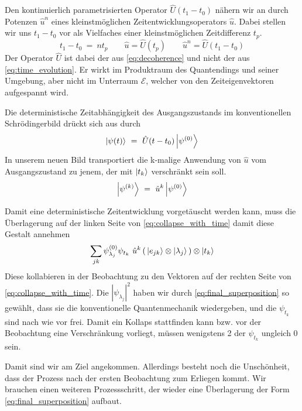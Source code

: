 \documentclass[12pt]{article}
\begin{document}
Den kontinuierlich parametrisierten Operator $\hat{U}(t_1-t_0)$ nähern wir an durch Potenzen $\hat{u}^n$ eines kleinstmöglichen Zeitentwicklungsoperators $\hat{u}$. Dabei stellen wir uns $t_1-t_0$ vor als Vielfaches einer kleinstmöglichen Zeitdifferenz $t_p$.
\begin{equation*}
t_1-t_0\ =\ n t_p \quad\quad 
\hat{u} = \hat{U}(t_p) \quad\quad 
\hat{u}^n = \hat{U}(t_1-t_0)
\end{equation*}
Der Operator $\hat{U}$ ist dabei der aus \eqref{eq:decoherence} und nicht der aus \eqref{eq:time_evolution}. Er wirkt im Produktraum des Quantendings und seiner Umgebung, aber nicht im Unterraum $\mathscr{E}$, welcher von den Zeiteigenvektoren aufgespannt wird.

Die deterministische Zeitabhängigkeit des Ausgangszustands im konventionellen Schrödingerbild drückt sich aus durch
\begin{equation*}
\ket{\psi(t)}\ =\ \hat{U}(t-t_0)\ket{\psi^{(0)}}
\end{equation*} 
In unserem neuen Bild transportiert die k-malige Anwendung von $\hat{u}$ vom Ausgangszustand zu jenem, der mit $\ket{t_k}$ verschränkt sein soll.
\begin{equation*}
\ket{\psi^{(k)}}\ =\ \hat{u}^k \ket{\psi^{(0)}}
\end{equation*} 

Damit eine deterministische Zeitentwicklung vorgetäuscht werden kann, muss die Überlagerung auf der linken Seite von \eqref{eq:collapse_with_time} damit diese Gestalt annehmen
\begin{equation}
\label{eq:final_superposition}
\sum_{jk} \psi_{\lambda_j}^{(0)}\psi_{t_k}\ \hat{u}^{k} \left(\,\ket{e_{jk}} \otimes \ket{\lambda_j} \,\right) \otimes \ket{t_k}
\end{equation}
Diese kollabieren in der Beobachtung zu den Vektoren auf der rechten Seite von  \eqref{eq:collapse_with_time}. Die $|\psi_{\lambda_j}|^2$ haben wir durch \eqref{eq:final_superposition} so gewählt, dass sie die konventionelle Quantenmechanik wiedergeben, und die $\psi_{t_k}$ sind nach wie vor frei. Damit ein Kollaps stattfinden kann bzw. vor der Beobachtung eine Verschränkung vorliegt, müssen wenigstens 2 der $\psi_{t_k}$ ungleich 0 sein. 

Damit sind wir am Ziel angekommen. Allerdings besteht noch die Unschönheit, dass der Prozess nach der ersten Beobachtung zum Erliegen kommt. Wir brauchen einen weiteren Prozessschritt, der wieder eine Überlagerung der Form \eqref{eq:final_superposition} aufbaut. 
\end{document}

